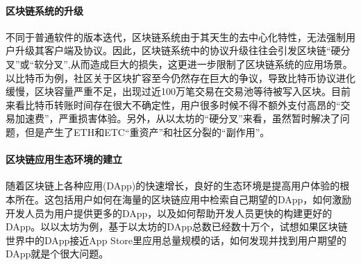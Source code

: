 \paragraph{区块链系统的升级}不同于普通软件的版本迭代，区块链系统由于其天生的去中心化特性，无法强制用户升级其客户端及协议。因此，区块链系统中的协议升级往往会引发区块链“硬分叉”或“软分叉”,从而造成巨大的损失，这更进一步限制了区块链系统的应用场景。以比特币为例，社区关于区块扩容至今仍然存在巨大的争议，导致比特币协议进化缓慢，区块容量严重不足，出现过近100万笔交易在交易池等待被写入区块。目前来看比特币转账时间存在很大不确定性，用户很多时候不得不额外支付高昂的“交易加速费”，严重损害体验。另外，从以太坊的“硬分叉”来看，虽然暂时解决了问题，但是产生了ETH和ETC“重资产”和社区分裂的“副作用”。

\paragraph{区块链应用生态环境的建立}随着区块链上各种应用(DApp)的快速增长，良好的生态环境是提高用户体验的根本所在。这包括用户如何在海量的区块链应用中检索自己期望的DApp，如何激励开发人员为用户提供更多的DApp，以及如何帮助开发人员更快的构建更好的DApp。以以太坊为例，基于以太坊的DApp总数已经数十万个，试想如果区块链世界中的DApp接近App Store里应用总量规模的话，如何发现并找到用户期望的DApp就是个很大问题。


